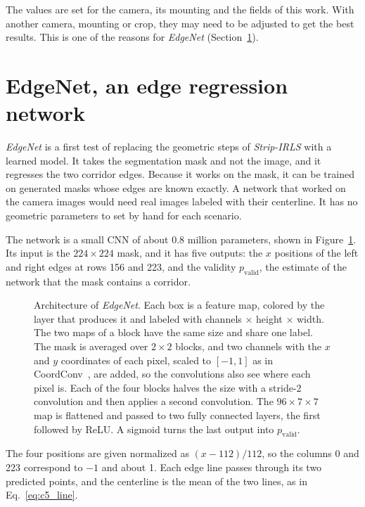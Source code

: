 The values are set for the camera, its mounting and the fields of this work. With another camera, mounting or crop, they may need to be adjusted to get the best results. This is one of the reasons for \textit{EdgeNet} (Section~\ref{sec:c5_network}).

\section{EdgeNet, an edge regression network}
\label{sec:c5_network}

\textit{EdgeNet} is a first test of replacing the geometric steps of \textit{Strip-IRLS} with a learned model. It takes the segmentation mask and not the image, and it regresses the two corridor edges. Because it works on the mask, it can be trained on generated masks whose edges are known exactly. A network that worked on the camera images would need real images labeled with their centerline. It has no geometric parameters to set by hand for each scenario.

The network is a small CNN of about 0.8 million parameters, shown in Figure~\ref{fig:c5_edgenet}. Its input is the $224\times224$ mask, and it has five outputs: the $x$ positions of the left and right edges at rows 156 and 223, and the validity $p_{\mathrm{valid}}$, the estimate of the network that the mask contains a corridor.

\begin{figure}[H]
    \centering
    \caption{Architecture of \textit{EdgeNet}. Each box is a feature map, colored by the layer that produces it and labeled with channels $\times$ height $\times$ width. The two maps of a block have the same size and share one label. The mask is averaged over $2\times2$ blocks, and two channels with the $x$ and $y$ coordinates of each pixel, scaled to $[-1,1]$ as in CoordConv~\cite{liu2018coordconv}, are added, so the convolutions also see where each pixel is. Each of the four blocks halves the size with a stride-2 convolution and then applies a second convolution. The $96\times7\times7$ map is flattened and passed to two fully connected layers, the first followed by ReLU. A sigmoid turns the last output into $p_{\mathrm{valid}}$.}
    \label{fig:c5_edgenet}
\end{figure}

The four positions are given normalized as $(x-112)/112$, so the columns 0 and 223 correspond to $-1$ and about 1. Each edge line passes through its two predicted points, and the centerline is the mean of the two lines, as in Eq.~\eqref{eq:c5_line}.

